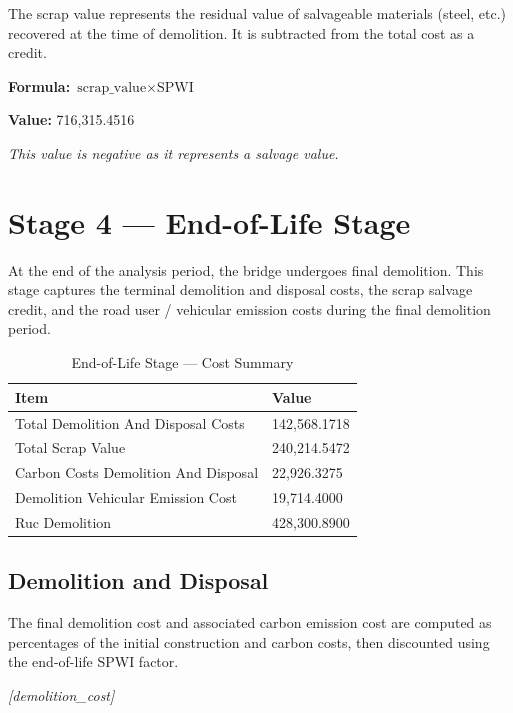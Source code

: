 \documentclass[12pt,a4paper]{article}
\begin{document}
The scrap value represents the residual value of salvageable materials (steel, etc.) recovered at the time of demolition. It is subtracted from the total cost as a credit.


\textbf{Formula:} $\text{scrap\_value} \times \text{SPWI}$


\textbf{Value:} 716,315.4516


\textit{This value is negative as it represents a salvage value.}



\section{Stage 4 --- End-of-Life Stage}

At the end of the analysis period, the bridge undergoes final demolition. This stage captures the terminal demolition and disposal costs, the scrap salvage credit, and the road user / vehicular emission costs during the final demolition period.


\begin{table}[H]
\centering
\caption{End-of-Life Stage --- Cost Summary}
\begin{tabular}{L{9cm}R{5cm}}
\toprule
\textbf{Item} & \textbf{Value} \\
\midrule
  Total Demolition And Disposal Costs & 142,568.1718 \\
  Total Scrap Value & 240,214.5472 \\
  Carbon Costs Demolition And Disposal & 22,926.3275 \\
  Demolition Vehicular Emission Cost & 19,714.4000 \\
  Ruc Demolition & 428,300.8900 \\
\bottomrule
\end{tabular}
\end{table}


\subsection{Demolition and Disposal}

The final demolition cost and associated carbon emission cost are computed as percentages of the initial construction and carbon costs, then discounted using the end-of-life SPWI factor.


\textit{[demolition\_cost]}
\end{document}

